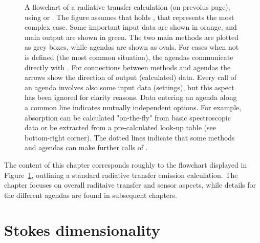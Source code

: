 \begin{figure}[t]
  \caption{A flowchart of a radiative transfer calculation (on prevoius page),
    using  or . The figure assumes that
     holds , that
    represents the most complex case. Some important input data are shown in
    orange, and main output are shown in green. The two main methods are
    plotted as grey boxes, while agendas are shown as ovals. For cases when
     not is defined (the most common situation),
    the agendas communicate directly with . For
    connections between methods and agendas the arrows show the direction of
    output (calculated) data. Every call of an agenda involves also some input
    data (settings), but this aspect has been ignored for clarity reasons. Data
    entering an agenda along a common line indicates mutually independent
    options. For example, absorption can be calculated "on-the-fly" from basic
    spectroscopic data or be extracted from a pre-calculated look-up table (see
    bottom-right corner). The dotted lines indicate that some methods and
    agendas can make further calls of .}
  \label{fig:ycalc_flow}
\end{figure}

The content of this chapter corresponds roughly to the flowchart displayed in
Figure~\ref{fig:ycalc_flow}, outlining a standard radiative transfer emission
calculation. The chapter focuses on overall raditaive transfer and sensor
aspects, while details for the different agendas are found in subsequent
chapters.



\section{Stokes dimensionality}
\label{sec:fm_defs:polarisation}

